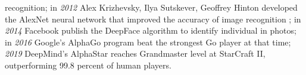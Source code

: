 recognition; in \emph{2012} Alex Krizhevsky, Ilya Sutskever, Geoffrey Hinton developed the AlexNet neural network that improved the accuracy of image recognition \cite{alexnet}; in \emph{2014} Facebook publish the DeepFace algorithm to identify individual in photos; in \emph{2016} Google's AlphaGo program beat the strongest Go player at that time; \emph{2019} DeepMind's AlphaStar reaches Grandmaster level at StarCraft II, outperforming 99.8 percent of human players.






